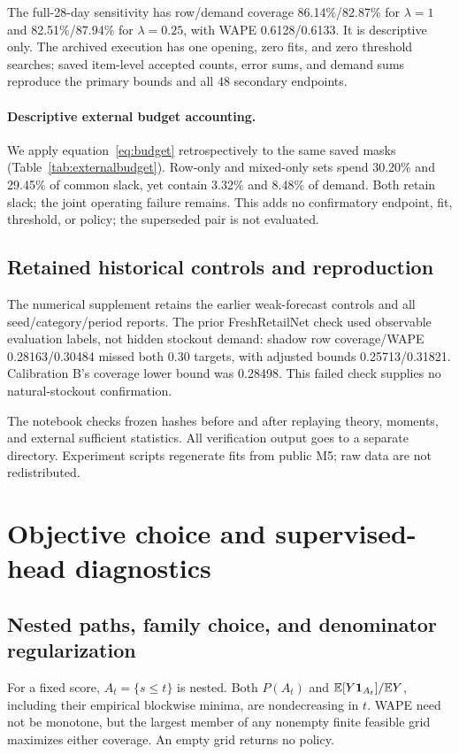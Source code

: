 
The full-28-day sensitivity has row/demand coverage 86.14\%/82.87\% for $\lambda=1$ and 82.51\%/87.94\% for $\lambda=0.25$, with WAPE 0.6128/0.6133. It is descriptive only. The archived execution has one opening, zero fits, and zero threshold searches; saved item-level accepted counts, error sums, and demand sums reproduce the primary bounds and all 48 secondary endpoints.

\paragraph{Descriptive external budget accounting.}
We apply equation~\eqref{eq:budget} retrospectively to the same saved masks (Table~\ref{tab:externalbudget}). Row-only and mixed-only sets spend 30.20\% and 29.45\% of common slack, yet contain 3.32\% and 8.48\% of demand. Both retain slack; the joint operating failure remains. This adds no confirmatory endpoint, fit, threshold, or policy; the superseded pair is not evaluated.


\subsection{Retained historical controls and reproduction}
\label{app:history}\label{app:legacyselection}
The numerical supplement retains the earlier weak-forecast controls and all seed/category/period reports. The prior FreshRetailNet check used observable evaluation labels, not hidden stockout demand: shadow row coverage/WAPE 0.28163/0.30484 missed both 0.30 targets, with adjusted bounds 0.25713/0.31821. Calibration B's coverage lower bound was 0.28498. This failed check supplies no natural-stockout confirmation.

The notebook checks frozen hashes before and after replaying theory, moments, and external sufficient statistics. All verification output goes to a separate directory. Experiment scripts regenerate fits from public M5; raw data are not redistributed.

\section{Objective choice and supervised-head diagnostics}
\label{app:objective}
\subsection{Nested paths, family choice, and denominator regularization}
For a fixed score, $A_t=\{s\leq t\}$ is nested. Both $P(A_t)$ and $\mathbb{E}[Y\mathbf{1}_{A_t}]/\mathbb{E} Y$, including their empirical blockwise minima, are nondecreasing in $t$. WAPE need not be monotone, but the largest member of any nonempty finite feasible grid maximizes either coverage. An empty grid returns no policy.

